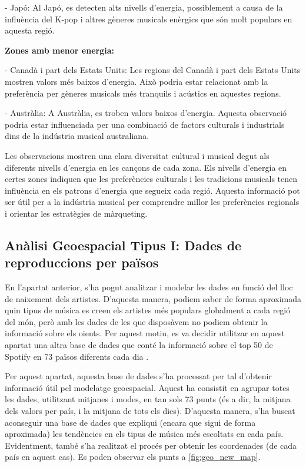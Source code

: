 - Japó: Al Japó, es detecten alts nivells d'energia, possiblement a causa de la influència del K-pop i altres gèneres musicals enèrgics que són molt populars en aquesta regió.

\textbf{Zones amb menor energia:}

- Canadà i part dels Estats Units: Les regions del Canadà i part dels Estats Units mostren valors més baixos d'energia. Això podria estar relacionat amb la preferència per gèneres musicals més tranquils i acústics en aquestes regions.

- Austràlia: A Austràlia, es troben valors baixos d'energia. Aquesta observació podria estar influenciada per una combinació de factors culturals i industrials dins de la indústria musical australiana.


Les observacions mostren una clara diversitat cultural i musical degut als diferents nivells d'energia en les cançons de cada zona. Els nivells d'energia en certes zones indiquen que les preferències culturals i les tradicions musicals tenen influència en els patrons d'energia que segueix cada regió. Aquesta informació pot ser útil per a la indústria musical per comprendre millor les preferències regionals i orientar les estratègies de màrqueting.

\subsection{Anàlisi Geoespacial Tipus I: Dades de reproduccions per països}
En l'apartat anterior, s'ha pogut analitzar i modelar les dades en funció del lloc de naixement dels artistes. D'aquesta manera, podiem saber de forma aproximada quin tipus de música es creen els artistes més populars globalment a cada regió del món, però amb les dades de les que disposàvem no podiem obtenir la informació sobre els oients. Per aquest motiu, es va decidir utilitzar en aquest apartat una altra base de dades que conté la informació sobre el top 50 de Spotify en 73 països diferents cada dia \cite{asaniczka2024top}.


Per aquest apartat, aquesta base de dades s'ha processat per tal d'obtenir informació útil pel modelatge geoespacial. Aquest ha consistit en agrupar totes les dades, utilitzant mitjanes i modes, en tan sols 73 punts (és a dir, la mitjana dels valors per país, i la mitjana de tots els dies). D'aquesta manera, s'ha buscat aconseguir una base de dades que expliqui (encara que sigui de forma aproximada) les tendències en els tipus de música més escoltats en cada país. Evidentment, també s'ha realitzat el procés per obtenir les coordenades (de cada país en aquest cas). Es poden observar els punts a \ref{fig:geo_new_map}.

